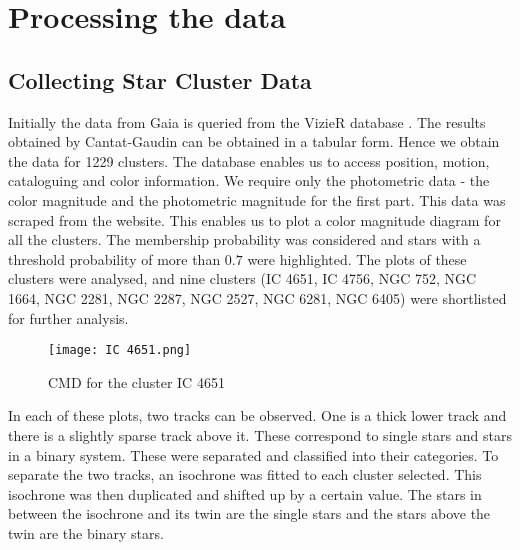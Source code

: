 \chapter{Processing the data}\label{ch:ch2}

\section{Collecting Star Cluster Data}
Initially the data from Gaia is queried from the VizieR database \citep{vizier}. The results obtained by Cantat-Gaudin \citep{cg} can be obtained in a tabular form. Hence we obtain the data for 1229 clusters. The database enables us to access position, motion, cataloguing and color information. We require only the photometric data - the color magnitude and the photometric magnitude for the first part. This data was scraped from the website. This enables us to plot a color magnitude diagram for all the clusters. The membership probability was considered and stars with a threshold probability of more than $0.7$ were highlighted. The plots of these clusters were analysed, and nine clusters (IC 4651, IC 4756, NGC 752, NGC 1664, NGC 2281, NGC 2287, NGC 2527, NGC 6281, NGC 6405) were shortlisted for further analysis.

\begin{figure}[h]
	\centering
	\texttt{[image: IC 4651.png]}
	\caption{CMD for the cluster IC 4651}
	\label{fig:im2}
\end{figure}

In each of these plots, two tracks can be observed. One is a thick lower track and there is a slightly sparse track above it. These correspond to single stars and stars in a binary system. These were separated and classified into their categories. To separate the two tracks, an isochrone was fitted to each cluster selected. This isochrone was then duplicated and shifted up by a certain value. The stars in between the isochrone and its twin are the single stars and the stars above the twin are the binary stars.

